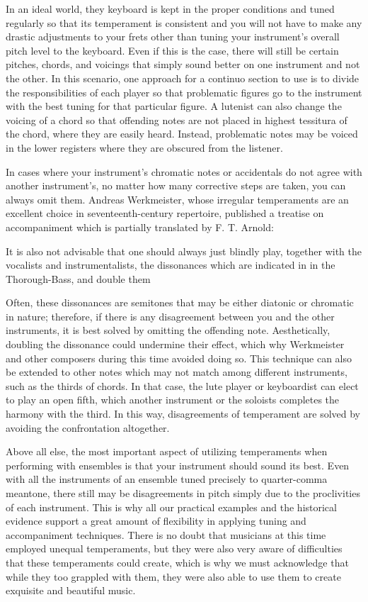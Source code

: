 In an ideal world, they keyboard is kept in the proper conditions and tuned regularly so that its
temperament is consistent and you will not have to make any drastic adjustments to your frets other
than tuning your instrument's overall pitch level to the keyboard. Even if this is the case, there
will still be certain pitches, chords, and voicings that simply sound better on one instrument and
not the other.  In this scenario, one approach for a continuo section to use is to divide the
responsibilities of each player so that problematic figures go to the instrument with the best
tuning for that particular figure.  A lutenist can also change the voicing of a chord so that
offending notes are not placed in highest tessitura of the chord, where they are easily heard.
Instead, problematic notes may be voiced in the lower registers where they are obscured from the
listener.

In cases where your instrument's chromatic notes or accidentals do not agree with another
instrument's, no matter how many corrective steps are taken, you can always omit them. Andreas
Werkmeister, whose irregular temperaments are an excellent choice in seventeenth-century repertoire,
published a treatise on accompaniment which is partially translated by F. T. Arnold:
\begin{blocks}
It is also not advisable that one should always just blindly play, together with the vocalists
and instrumentalists, the dissonances which are indicated in in the Thorough-Bass, and double
them
\autocite[210]{FTA:1}
\end{blocks}
Often, these dissonances are semitones that may be either diatonic or chromatic in nature;
therefore, if there is any disagreement between you and the other instruments, it is best solved by
omitting the offending note.  Aesthetically, doubling the dissonance could undermine their effect,
which why Werkmeister and other composers during this time avoided doing so.  \autocite[45]{RJ:1}
This technique can also be extended to other notes which may not match among different instruments,
such as the thirds of chords.  In that case, the lute player or keyboardist can elect to play an
open fifth, which another instrument or the soloists completes the harmony with the third.  In this
way, disagreements of temperament are solved by avoiding the confrontation altogether.

Above all else, the most important aspect of utilizing temperaments when performing with ensembles
is that your instrument should sound its best. Even with all the instruments of an ensemble tuned
precisely to quarter-comma meantone, there still may be disagreements in pitch simply due to the
proclivities of each instrument. This is why all our practical examples and the historical evidence
support a great amount of flexibility in applying tuning and accompaniment techniques. There is no
doubt that musicians at this time employed unequal temperaments, but they were also very aware of
difficulties that these temperaments could create, which is why we must acknowledge that while they
too grappled with them, they were also able to use them to create exquisite and beautiful music.

